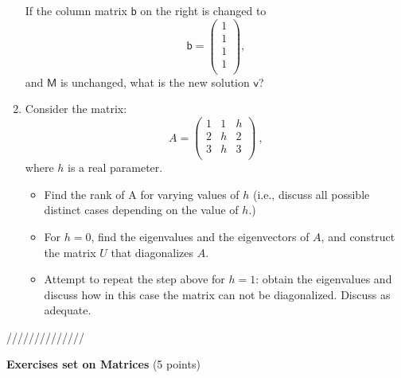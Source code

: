 \documentclass[fleqn]{article}
\begin{document}
\begin{enumerate}
    If the column matrix $\mathsf{b}$ on the right is changed to 
    \[
      \mathsf{b}
      =
      \left(
      \begin{array}{c}
          1 \\
          1 \\
          1 \\
          1  \\
      \end{array}
      \right),
    \]
    and $\mathsf{M}$ is unchanged, what is the new solution $\mathsf{v}$?
  
  
  \item Consider the matrix:
    $$
    A=\left(
    \begin{array}{ccc}
    1 & 1 & h \\
    2 & h & 2 \\
    3 & h & 3 \\
    \end{array}
    \right)~,
    $$
    where $h$ is a real parameter.  
    \begin{itemize}
    \item Find the rank of A for varying values of $h$ (i.e., discuss all possible distinct cases depending on the value of $h$.) 
  
    \item  For $h=0$, find the eigenvalues and the eigenvectors of $A$, and construct the matrix $U$ that diagonalizes $A$. 
  
    \item Attempt to repeat the step above for $h=1$: obtain the eigenvalues and discuss how in this case the matrix can not be diagonalized. Discuss as adequate. 
    \end{itemize}
  
  
  \end{enumerate}

\pagebreak

//////////////

\textbf{Exercises set on Matrices} (5 points)
\end{document}

